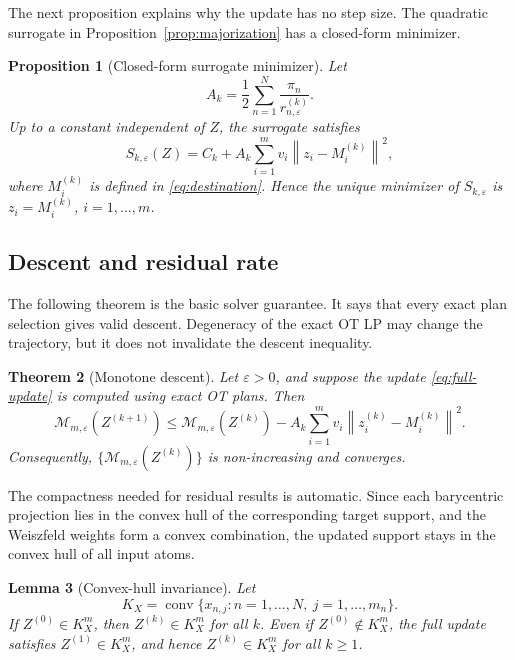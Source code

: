 \documentclass[pdflatex,sn-mathphys-ay]{sn-jnl}%
\theoremstyle{thmstyleone}%
\newtheorem{theorem}{Theorem}%
\newtheorem{proposition}[theorem]{Proposition}%
\newtheorem{lemma}[theorem]{Lemma}
\theoremstyle{thmstyletwo}%
\theoremstyle{thmstylethree}%
\newcommand{\calM}{\mathcal M}
\newcommand{\eps}{\varepsilon}
\newcommand{\conv}{\operatorname{conv}}
\newcommand{\norm}[1]{\left\lVert #1\right\rVert}
\begin{document}
The next proposition explains why the update has no step size. The quadratic surrogate in Proposition~\ref{prop:majorization} has a closed-form minimizer.

\begin{proposition}[Closed-form surrogate minimizer]\label{prop:minimizer}
Let
\begin{equation}\label{eq:Ak}
    A_k=\frac12\sum_{n=1}^N\frac{\pi_n}{r_{n,\eps}^{(k)}}.
\end{equation}
Up to a constant independent of \(Z\), the surrogate satisfies
\begin{equation}\label{eq:square}
    S_{k,\eps}(Z)=C_k+A_k\sum_{i=1}^m v_i\norm{z_i-M_i^{(k)}}^2,
\end{equation}
where \(M_i^{(k)}\) is defined in \eqref{eq:destination}. Hence the unique minimizer of \(S_{k,\eps}\) is \(z_i=M_i^{(k)}\), \(i=1,\ldots,m\).
\end{proposition}

\subsection{Descent and residual rate}

The following theorem is the basic solver guarantee. It says that every exact plan selection gives valid descent. Degeneracy of the exact OT LP may change the trajectory, but it does not invalidate the descent inequality.

\begin{theorem}[Monotone descent]\label{thm:descent}
Let \(\eps>0\), and suppose the update \eqref{eq:full-update} is computed using exact OT plans. Then
\begin{equation}\label{eq:descent}
    \calM_{m,\eps}(Z^{(k+1)})
    \le
    \calM_{m,\eps}(Z^{(k)})
    -
    A_k
    \sum_{i=1}^m v_i\norm{z_i^{(k)}-M_i^{(k)}}^2.
\end{equation}
Consequently, \(\{\calM_{m,\eps}(Z^{(k)})\}\) is non-increasing and converges.
\end{theorem}

The compactness needed for residual results is automatic. Since each barycentric projection lies in the convex hull of the corresponding target support, and the Weiszfeld weights form a convex combination, the updated support stays in the convex hull of all input atoms.

\begin{lemma}[Convex-hull invariance]\label{lem:hull}
Let
\[
    K_X=\conv\{x_{n,j}:n=1,\ldots,N,\ j=1,\ldots,m_n\}.
\]
If \(Z^{(0)}\in K_X^m\), then \(Z^{(k)}\in K_X^m\) for all \(k\). Even if \(Z^{(0)}\notin K_X^m\), the full update satisfies \(Z^{(1)}\in K_X^m\), and hence \(Z^{(k)}\in K_X^m\) for all \(k\ge1\).
\end{lemma}
\end{document}
